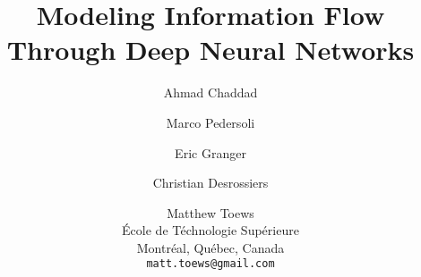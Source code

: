 \documentclass[10pt,onecolumn]{article}
\begin{document}
\title{Modeling Information Flow Through Deep Neural Networks}

\author{Ahmad Chaddad
\and
Marco Pedersoli
\and
Eric Granger
\and
Christian Desrossiers
\and
Matthew Toews
\\
\'Ecole de T\'echnologie Sup\'erieure\\
Montr\'eal, Qu\'ebec, Canada\\
{\tt\small matt.toews@gmail.com}
}


\maketitle
\end{document}

